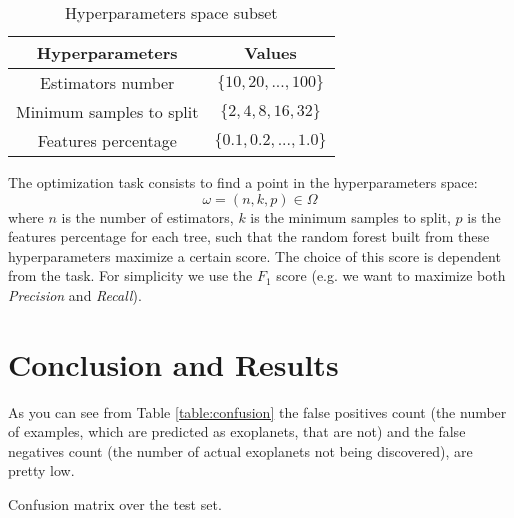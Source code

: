 \documentclass[11pt, a4paper]{article}
\begin{document}
\begin{multicols}{2}
  \begin{table}[H]
    \centering
    \begin{tabular}{|c c|}
      \hline
      Hyperparameters & Values \\
      \hline\hline
      Estimators number & $\{10,20,...,100\}$ \\
      \hline
      Minimum samples to split & $\{2,4,8,16,32\}$ \\
      \hline
      Features percentage & $\{0.1,0.2,...,1.0\}$ \\
      \hline
    \end{tabular}
    \caption{Hyperparameters space subset}
    \label{table:hyperparameters}
  \end{table}

  The optimization task consists to find a point in the hyperparameters space:
  \[\omega=(n, k, p)\in\Omega\]
  where $n$ is the number of estimators, $k$ is the minimum samples to split, $p$ is the features percentage for each tree, such that the random forest built from these hyperparameters maximize a certain score. The choice of this score is dependent from the task. For simplicity we use the $F_{1}$ score (e.g. we want to maximize both \textit{Precision} and \textit{Recall}).

\section{Conclusion and Results}
  As you can see from Table \ref{table:confusion} the false positives count (the number of examples, which are predicted as exoplanets, that are not) and the false negatives count (the number of actual exoplanets not being discovered), are pretty low.
  \begin{table}[H]
    \centering
    \caption{Confusion matrix over the test set.}
    \label{table:confusion}
  \end{table}


\end{multicols}
\end{document}

